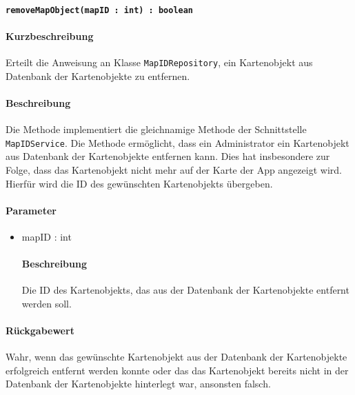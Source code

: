 \paragraph{\texttt{removeMapObject(mapID : int) : boolean}}%
\paragraph*{Kurzbeschreibung}
Erteilt die Anweisung an Klasse \texttt{MapIDRepository}, ein Kartenobjekt aus Datenbank der Kartenobjekte zu entfernen.
\paragraph*{Beschreibung}
Die Methode implementiert die gleichnamige Methode der Schnittstelle \texttt{MapIDService}.
Die Methode ermöglicht, dass ein Administrator ein Kartenobjekt aus Datenbank der Kartenobjekte entfernen kann.
Dies hat insbesondere zur Folge, dass das Kartenobjekt nicht mehr auf der Karte der App angezeigt wird.
Hierfür wird die ID des gewünschten Kartenobjekts übergeben.
\paragraph*{Parameter}
\begin{itemize}
    \item mapID : int
    		\paragraph*{Beschreibung}
    		Die ID des Kartenobjekts, das aus der Datenbank der Kartenobjekte entfernt werden soll.
\end{itemize}
\paragraph*{Rückgabewert}
Wahr, wenn das gewünschte Kartenobjekt aus der Datenbank der Kartenobjekte erfolgreich entfernt werden konnte oder das das Kartenobjekt bereits nicht in der Datenbank der Kartenobjekte hinterlegt war, ansonsten falsch.
